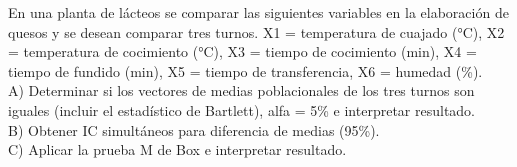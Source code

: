 \documentclass[12pt]{article}
\newenvironment{problem}[2][Problema]{\begin{trivlist}
\item[\hskip \labelsep {\bfseries #1}\hskip \labelsep {\bfseries #2.}]}{\end{trivlist}}
\begin{document}

\begin{problem}{3}
En una planta de lácteos se comparar las siguientes variables en la elaboración de quesos y se desean
comparar tres turnos.
X1 = temperatura de cuajado (°C), X2 = temperatura de cocimiento (°C),
X3 = tiempo de cocimiento (min), X4 = tiempo de fundido (min),
X5 = tiempo de transferencia, X6 = humedad (\%).\\
A) Determinar si los vectores de medias poblacionales de los tres turnos son iguales (incluir el
estadístico de Bartlett), alfa = 5\% e interpretar resultado.\\
B) Obtener IC simultáneos para diferencia de medias (95\%).\\
C) Aplicar la prueba M de Box e interpretar resultado.
\end{problem}
\end{document}
